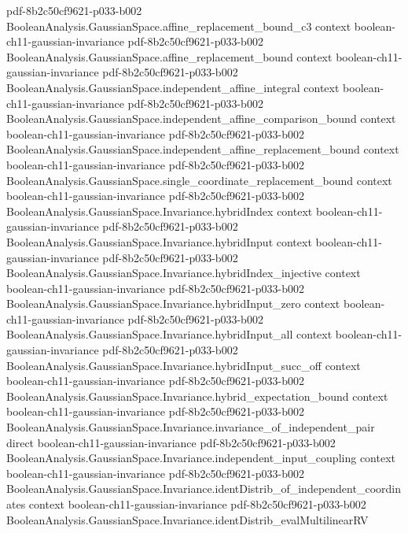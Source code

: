\begin{theorem}
  {pdf-8b2c50cf9621-p033-b002}
\proofstep
  {BooleanAnalysis.GaussianSpace.affine_replacement_bound_c3}
  {context}
  {boolean-ch11-gaussian-invariance}
  {pdf-8b2c50cf9621-p033-b002}
\proofstep
  {BooleanAnalysis.GaussianSpace.affine_replacement_bound}
  {context}
  {boolean-ch11-gaussian-invariance}
  {pdf-8b2c50cf9621-p033-b002}
\proofstep
  {BooleanAnalysis.GaussianSpace.independent_affine_integral}
  {context}
  {boolean-ch11-gaussian-invariance}
  {pdf-8b2c50cf9621-p033-b002}
\proofstep
  {BooleanAnalysis.GaussianSpace.independent_affine_comparison_bound}
  {context}
  {boolean-ch11-gaussian-invariance}
  {pdf-8b2c50cf9621-p033-b002}
\proofstep
  {BooleanAnalysis.GaussianSpace.independent_affine_replacement_bound}
  {context}
  {boolean-ch11-gaussian-invariance}
  {pdf-8b2c50cf9621-p033-b002}
\proofstep
  {BooleanAnalysis.GaussianSpace.single_coordinate_replacement_bound}
  {context}
  {boolean-ch11-gaussian-invariance}
  {pdf-8b2c50cf9621-p033-b002}
\proofstep
  {BooleanAnalysis.GaussianSpace.Invariance.hybridIndex}
  {context}
  {boolean-ch11-gaussian-invariance}
  {pdf-8b2c50cf9621-p033-b002}
\proofstep
  {BooleanAnalysis.GaussianSpace.Invariance.hybridInput}
  {context}
  {boolean-ch11-gaussian-invariance}
  {pdf-8b2c50cf9621-p033-b002}
\proofstep
  {BooleanAnalysis.GaussianSpace.Invariance.hybridIndex_injective}
  {context}
  {boolean-ch11-gaussian-invariance}
  {pdf-8b2c50cf9621-p033-b002}
\proofstep
  {BooleanAnalysis.GaussianSpace.Invariance.hybridInput_zero}
  {context}
  {boolean-ch11-gaussian-invariance}
  {pdf-8b2c50cf9621-p033-b002}
\proofstep
  {BooleanAnalysis.GaussianSpace.Invariance.hybridInput_all}
  {context}
  {boolean-ch11-gaussian-invariance}
  {pdf-8b2c50cf9621-p033-b002}
\proofstep
  {BooleanAnalysis.GaussianSpace.Invariance.hybridInput_succ_off}
  {context}
  {boolean-ch11-gaussian-invariance}
  {pdf-8b2c50cf9621-p033-b002}
\proofstep
  {BooleanAnalysis.GaussianSpace.Invariance.hybrid_expectation_bound}
  {context}
  {boolean-ch11-gaussian-invariance}
  {pdf-8b2c50cf9621-p033-b002}
\proofstep
  {BooleanAnalysis.GaussianSpace.Invariance.invariance_of_independent_pair}
  {direct}
  {boolean-ch11-gaussian-invariance}
  {pdf-8b2c50cf9621-p033-b002}
\proofstep
  {BooleanAnalysis.GaussianSpace.Invariance.independent_input_coupling}
  {context}
  {boolean-ch11-gaussian-invariance}
  {pdf-8b2c50cf9621-p033-b002}
\proofstep
  {BooleanAnalysis.GaussianSpace.Invariance.identDistrib_of_independent_coordinates}
  {context}
  {boolean-ch11-gaussian-invariance}
  {pdf-8b2c50cf9621-p033-b002}
\proofstep
  {BooleanAnalysis.GaussianSpace.Invariance.identDistrib_evalMultilinearRV}

\end{theorem}

